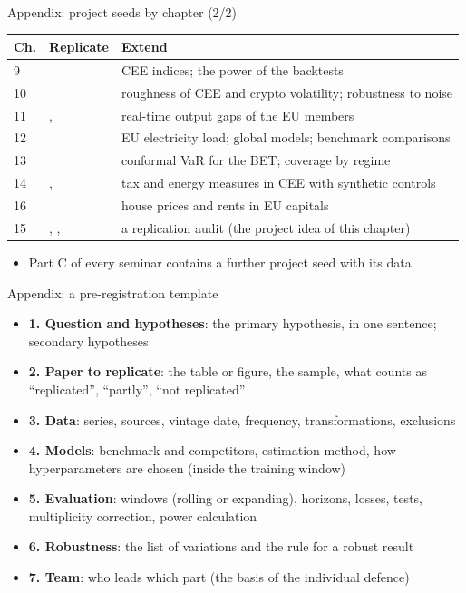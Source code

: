 \begin{frame}{Appendix: project seeds by chapter (2/2)}
\hypertarget{atsapp2}{}
\itemsize{\small}
\begin{center}
\scriptsize
\begin{tabular}{l>{\raggedright\arraybackslash}p{5.0cm}>{\raggedright\arraybackslash}p{6.6cm}}
\toprule
\textbf{Ch.} & \textbf{Replicate} & \textbf{Extend} \\
\midrule
9 & {} & CEE indices; the power of the backtests \\
10 & {} & roughness of CEE and crypto volatility; robustness to noise \\
11 & , {} & real-time output gaps of the EU members \\
12 & {} & EU electricity load; global models; benchmark comparisons \\
13 & {} & conformal VaR for the BET; coverage by regime \\
14 & , {} & tax and energy measures in CEE with synthetic controls \\
16 & {} & house prices and rents in EU capitals \\
15 & , , {} & a replication audit (the project idea of this chapter) \\
\bottomrule
\end{tabular}
\end{center}
\begin{itemize}
    \item Part C of every seminar contains a further project seed with its data
\end{itemize}
\end{frame}

\begin{frame}{Appendix: a pre-registration template}
\hypertarget{atsapp3}{}
\itemsize{\small}
\begin{itemize}
    \item \textbf{1. Question and hypotheses}: the primary hypothesis, in one sentence; secondary hypotheses
    \item \textbf{2. Paper to replicate}: the table or figure, the sample, what counts as ``replicated'', ``partly'', ``not replicated''
    \item \textbf{3. Data}: series, sources, vintage date, frequency, transformations, exclusions
    \item \textbf{4. Models}: benchmark and competitors, estimation method, how hyperparameters are chosen (inside the training window)
    \item \textbf{5. Evaluation}: windows (rolling or expanding), horizons, losses, tests, multiplicity correction, power calculation
    \item \textbf{6. Robustness}: the list of variations and the rule for a robust result
    \item \textbf{7. Team}: who leads which part (the basis of the individual defence)
\end{itemize}
\end{frame}


